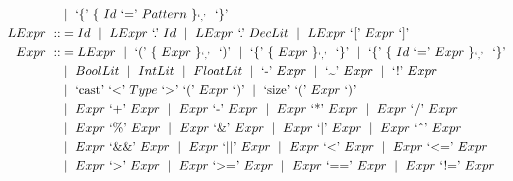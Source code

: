 \documentclass[letterpaper]{article}
\newcommand{\nonterminal}[1]{#1\ }
\newcommand{\terminal}[1]{\text{`#1'}\ }
\newcommand*{\gramRepeat}[2][]{\{\ #2\}_{#1}\ }
\newcommand{\gramOr}{\mid\ }
\begin{document}
\begin{align*}
    &\gramOr \terminal{\{}
      \gramRepeat[\terminal{,}]{\nonterminal{Id} \terminal{=} \nonterminal{Pattern}} \terminal{\}} \\
%
  \nonterminal{LExpr} ::&= \nonterminal{Id}
    \gramOr \nonterminal{LExpr} \terminal{.} \nonterminal{Id}
    \gramOr \nonterminal{LExpr} \terminal{.} \nonterminal{DecLit}
    \gramOr \nonterminal{LExpr} \terminal{[} \nonterminal{Expr} \terminal{]} \\
%
  \nonterminal{Expr} ::&= \nonterminal{LExpr}
    \gramOr \terminal{(} \gramRepeat[\terminal{,}]{\nonterminal{Expr}} \terminal{)}
    \gramOr \terminal{\{} \gramRepeat[\terminal{,}]{\nonterminal{Expr}} \terminal{\}}
    \gramOr \terminal{\{}
      \gramRepeat[\terminal{,}]{\nonterminal{Id} \terminal{=} \nonterminal{Expr}} \terminal{\}} \\
    &\gramOr \nonterminal{BoolLit} \gramOr \nonterminal{IntLit} \gramOr \nonterminal{FloatLit}
     \gramOr \terminal{-} \nonterminal{Expr}
     \gramOr \terminal{\texttildelow} \nonterminal{Expr}
     \gramOr \terminal{!} \nonterminal{Expr} \\
    &\gramOr \terminal{cast} \terminal{\textless} \nonterminal{Type} \terminal{\textgreater}
            \terminal{(} \nonterminal{Expr} \terminal{)}
     \gramOr \terminal{size} \terminal{(} \nonterminal{Expr} \terminal{)} \\
    &\gramOr \nonterminal{Expr} \terminal{+} \nonterminal{Expr}
     \gramOr \nonterminal{Expr} \terminal{-} \nonterminal{Expr}
     \gramOr \nonterminal{Expr} \terminal{*} \nonterminal{Expr}
     \gramOr \nonterminal{Expr} \terminal{/} \nonterminal{Expr} \\
    &\gramOr \nonterminal{Expr} \terminal{\%} \nonterminal{Expr}
     \gramOr \nonterminal{Expr} \terminal{\&} \nonterminal{Expr}
     \gramOr \nonterminal{Expr} \terminal{\textbar} \nonterminal{Expr}
     \gramOr \nonterminal{Expr} \terminal{\^{}} \nonterminal{Expr} \\
    &\gramOr \nonterminal{Expr} \terminal{\&\&} \nonterminal{Expr}
     \gramOr \nonterminal{Expr} \terminal{\textbar\textbar} \nonterminal{Expr}
     \gramOr \nonterminal{Expr} \terminal{\textless} \nonterminal{Expr}
     \gramOr \nonterminal{Expr} \terminal{\textless=} \nonterminal{Expr} \\
    &\gramOr \nonterminal{Expr} \terminal{\textgreater} \nonterminal{Expr}
     \gramOr \nonterminal{Expr} \terminal{\textgreater=} \nonterminal{Expr}
     \gramOr \nonterminal{Expr} \terminal{==} \nonterminal{Expr}
     \gramOr \nonterminal{Expr} \terminal{!=} \nonterminal{Expr} \\

\end{align*}
\end{document}
